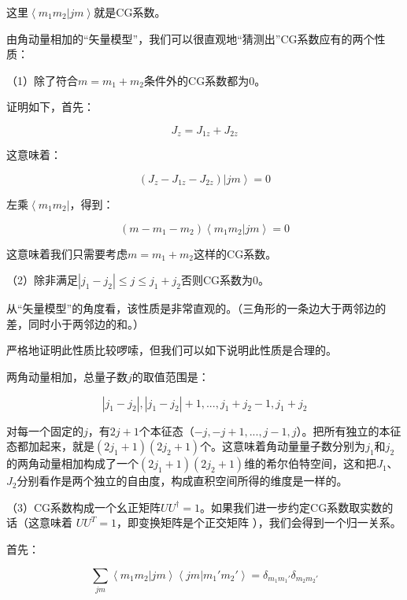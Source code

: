 这里$\left\langle m_1 m_2 | j m \right\rangle$就是CG系数。

由角动量相加的“矢量模型”，我们可以很直观地“猜测出”CG系数应有的两个性质：

（1）除了符合$m = m_1 + m_2$条件外的CG系数都为0。

证明如下，首先：

\begin{equation}
J_z = J_{1z} + J_{2z}
\end{equation}

这意味着：

\begin{equation}
(J_z - J_{1z} - J_{2z}) \left| jm \right\rangle = 0
\end{equation}

左乘$\left\langle m_1 m_2 \right|$，得到：

\begin{equation}
( m - m_1 - m_2) \left\langle m_1 m_2 | j m \right\rangle = 0 
\end{equation}

这意味着我们只需要考虑$m = m_1 + m_2$这样的CG系数。

（2）除非满足$| j_1 - j_2 | \le j \le j_1 + j_2$否则CG系数为0。

从“矢量模型”的角度看，该性质是非常直观的。（三角形的一条边大于两邻边的差，同时小于两邻边的和。）

严格地证明此性质比较啰嗦，但我们可以如下说明此性质是合理的。

两角动量相加，总量子数$j$的取值范围是：

\begin{equation*}
|j_1 - j_2|, |j_1 - j_2|+1 , ... , j_1 + j_2 -1, j_1 + j_2
\end{equation*}

对每一个固定的$j$，有$2j+1$个本征态（$-j, -j+1, ..., j-1, j$）。把所有独立的本征态都加起来，就是$(2j_1 + 1) (2 j_2 +1)$个。这意味着角动量量子数分别为$j_1$和$j_2$的两角动量相加构成了一个$(2j_1 + 1) (2 j_2 +1)$维的希尔伯特空间，这和把$J_1$、$J_2$分别看作是两个独立的自由度，构成直积空间所得的维度是一样的。

（3）CG系数构成一个幺正矩阵$U U^\dagger = 1$。如果我们进一步约定CG系数取实数的话（这意味着 $U U^T =1$，即变换矩阵是个正交矩阵 ），我们会得到一个归一关系。

首先：

\begin{equation}
\sum\limits_{jm}  \left\langle m_1 m_2 | j m \right\rangle \left\langle jm | m_1' m_2' \right\rangle = \delta_{m_1 m_1' } \delta_{ m_2 m_2'} 
\end{equation}


